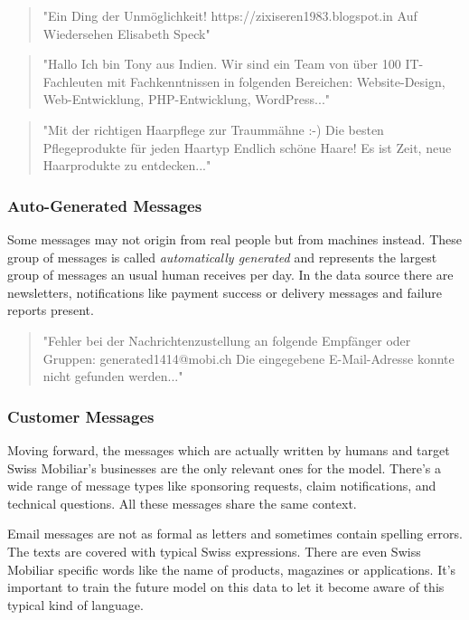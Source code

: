 \begin{quote}
    "Ein Ding der Unmöglichkeit! https://zixiseren1983.blogspot.in Auf Wiedersehen Elisabeth Speck"
\end{quote}

\begin{quote}
    "Hallo Ich bin Tony aus Indien. Wir sind ein Team von über 100 IT-Fachleuten mit Fachkenntnissen in folgenden Bereichen: Website-Design, Web-Entwicklung, PHP-Entwicklung, WordPress..."
\end{quote}

\begin{quote}
    "Mit der richtigen Haarpflege zur Traummähne :-) Die besten Pflegeprodukte für jeden Haartyp Endlich schöne Haare! Es ist Zeit, neue Haarprodukte zu entdecken..."
\end{quote}

\subsubsection{Auto-Generated Messages}

Some messages may not origin from real people but from machines instead. These group of messages is called \emph{automatically generated}
and represents the largest group of messages an usual human receives per day. In the data source there are newsletters, notifications
like payment success or delivery messages and failure reports present.

\begin{quote}
    "Fehler bei der Nachrichtenzustellung an folgende Empfänger oder Gruppen: generated1414@mobi.ch Die eingegebene E-Mail-Adresse konnte nicht gefunden werden..."
\end{quote}

\subsubsection{Customer Messages}

Moving forward, the messages which are actually written by humans and target Swiss Mobiliar's businesses are the only relevant
ones for the model. There's a wide range of message types like sponsoring requests, claim notifications, and technical questions.
All these messages share the same context.

Email messages are not as formal as letters and sometimes contain spelling errors. The texts are covered with typical Swiss expressions.
There are even Swiss Mobiliar specific words like the name of products, magazines or applications. It's important to train the future
model on this data to let it become aware of this typical kind of language.

